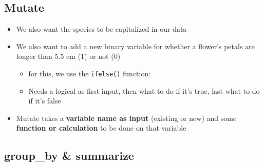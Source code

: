 \documentclass[
]{book}
\newenvironment{Shaded}{\begin{snugshade}}{\end{snugshade}}
\newcommand{\AttributeTok}[1]{\textcolor[rgb]{0.13,0.29,0.53}{#1}}
\newcommand{\CommentTok}[1]{\textcolor[rgb]{0.56,0.35,0.01}{\textit{#1}}}
\newcommand{\DecValTok}[1]{\textcolor[rgb]{0.00,0.00,0.81}{#1}}
\newcommand{\FloatTok}[1]{\textcolor[rgb]{0.00,0.00,0.81}{#1}}
\newcommand{\FunctionTok}[1]{\textcolor[rgb]{0.13,0.29,0.53}{\textbf{#1}}}
\newcommand{\NormalTok}[1]{#1}
\newcommand{\OtherTok}[1]{\textcolor[rgb]{0.56,0.35,0.01}{#1}}
\newcommand{\SpecialCharTok}[1]{\textcolor[rgb]{0.81,0.36,0.00}{\textbf{#1}}}
\providecommand{\tightlist}{%
  \setlength{\itemsep}{0pt}\setlength{\parskip}{0pt}}
\begin{document}
\subsection{Mutate}\label{mutate}

\begin{itemize}
\tightlist
\item
  We also want the species to be capitalized in our data
\item
  We also want to add a new binary variable for whether a flower's petals are longer than 5.5 cm (1) or not (0)

  \begin{itemize}
  \tightlist
  \item
    for this, we use the \texttt{ifelse()} function:
  \item
    Needs a logical as first input, then what to do if it's true, last what to do if it's false
  \end{itemize}
\item
  Mutate takes a \textbf{variable name as input} (existing or new) and some \textbf{function or calculation} to be done on that variable
\end{itemize}

\begin{Shaded}
\end{Shaded}

\subsection{group\_by \& summarize}\label{group_by-summarize}
\end{document}
